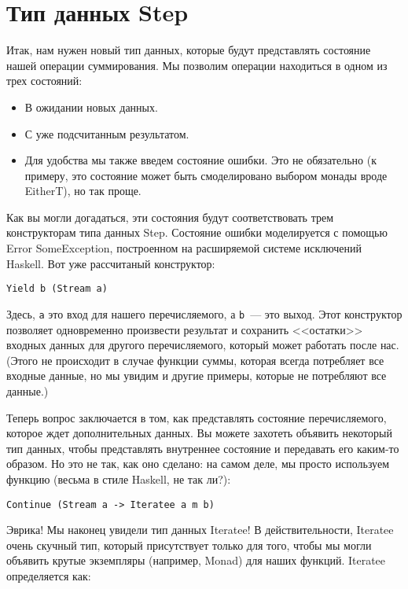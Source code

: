 \section{Тип данных Step}

Итак, нам нужен новый тип данных, которые будут представлять состояние нашей операции суммирования. Мы позволим операции находиться в одном из трех состояний:

\begin{itemize}
\item В ожидании новых данных.
\item С уже подсчитанным результатом.
\item Для удобства мы также введем состояние ошибки. Это не обязательно (к примеру, это состояние может быть смоделировано выбором монады вроде EitherT), но так проще.
\end{itemize}

Как вы могли догадаться, эти состояния будут соответствовать трем конструкторам типа данных Step. Состояние ошибки моделируется с помощью Error SomeException, построенном на расширяемой системе исключений Haskell. Вот уже рассчитаный конструктор:

\begin{lstlisting}
Yield b (Stream a)
\end{lstlisting}

Здесь, \lstinline'a' это вход для нашего перечисляемого, а \lstinline'b'~--- это выход. Этот конструктор позволяет одновременно произвести результат и сохранить <<остатки>> входных данных для другого перечисляемого, который может работать после нас. (Этого не происходит в случае функции суммы, которая всегда потребляет все входные данные, но мы увидим и другие примеры, которые не потребляют все данные.)

Теперь вопрос заключается в том, как представлять состояние перечисляемого, которое ждет дополнительных данных. Вы можете захотеть объявить некоторый тип данных, чтобы представлять внутреннее состояние и передавать его каким-то образом. Но это не так, как оно сделано: на самом деле, мы просто используем функцию (весьма в стиле Haskell, не так ли?):

\begin{lstlisting}
Continue (Stream a -> Iteratee a m b)
\end{lstlisting}

Эврика! Мы наконец увидели тип данных Iteratee! В действительности, Iteratee очень скучный тип, который присутствует только для того, чтобы мы могли объявить крутые экземпляры (например, Monad) для наших функций. Iteratee определяется как:

